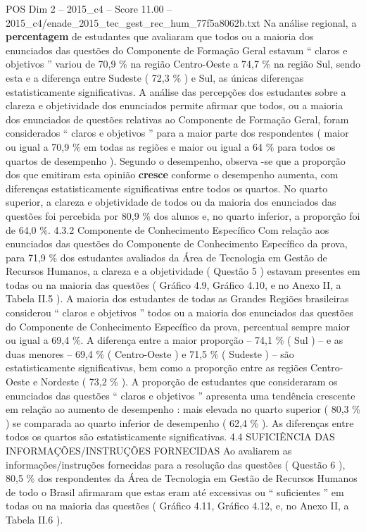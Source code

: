 \begin{textsample}{POS Dim 2 – 2015\_c4 – Score 11.00 – 2015\_c4/enade\_2015\_tec\_gest\_rec\_hum\_77f5a8062b.txt}
Na análise regional, a \textbf{percentagem} de estudantes que avaliaram que todos ou a maioria dos enunciados das questões do Componente de Formação Geral estavam “ claros e objetivos ” variou de 70,9 \% na região Centro-Oeste a 74,7 \% na região Sul, sendo esta e a diferença entre Sudeste ( 72,3 \% ) e Sul, as únicas diferenças estatisticamente significativas.
A análise das percepções dos estudantes sobre a clareza e objetividade dos enunciados permite afirmar que todos, ou a maioria dos enunciados de questões relativas ao Componente de Formação Geral, foram considerados “ claros e objetivos ” para a maior parte dos respondentes ( maior ou igual a 70,9 \% em todas as regiões e maior ou igual a 64 \% para todos os quartos de desempenho ).
Segundo o desempenho, observa -se que a proporção dos que emitiram esta opinião \textbf{cresce} conforme o desempenho aumenta, com diferenças estatisticamente significativas entre todos os quartos.
No quarto superior, a clareza e objetividade de todos ou da maioria dos enunciados das questões foi percebida por 80,9 \% dos alunos e, no quarto inferior, a proporção foi de 64,0 \%. 4.3.2 Componente de Conhecimento Específico Com relação aos enunciados das questões do Componente de Conhecimento Específico da prova, para 71,9 \% dos estudantes avaliados da Área de Tecnologia em Gestão de Recursos Humanos, a clareza e a objetividade ( Questão 5 ) estavam presentes em todas ou na maioria das questões ( Gráfico 4.9, Gráfico 4.10, e no Anexo II, a Tabela II.5 ).
A maioria dos estudantes de todas as Grandes Regiões brasileiras considerou “ claros e objetivos ” todos ou a maioria dos enunciados das questões do Componente de Conhecimento Específico da prova, percentual sempre maior ou igual a 69,4 \%.
A diferença entre a maior proporção – 74,1 \% ( Sul ) – e as duas menores – 69,4 \% ( Centro-Oeste ) e 71,5 \% ( Sudeste ) – são estatisticamente significativas, bem como a proporção entre as regiões Centro-Oeste e Nordeste ( 73,2 \% ).
A proporção de estudantes que consideraram os enunciados das questões “ claros e objetivos ” apresenta uma tendência crescente em relação ao aumento de desempenho : mais elevada no quarto superior ( 80,3 \% ) se comparada ao quarto inferior de desempenho ( 62,4 \% ).
As diferenças entre todos os quartos são estatisticamente significativas. 4.4 SUFICIÊNCIA DAS INFORMAÇÕES/INSTRUÇÕES FORNECIDAS Ao avaliarem as informações/instruções fornecidas para a resolução das questões ( Questão 6 ), 80,5 \% dos respondentes da Área de Tecnologia em Gestão de Recursos Humanos de todo o Brasil afirmaram que estas eram até excessivas ou “ suficientes ” em todas ou na maioria das questões ( Gráfico 4.11, Gráfico 4.12, e, no Anexo II, a Tabela II.6 ).

\end{textsample}

